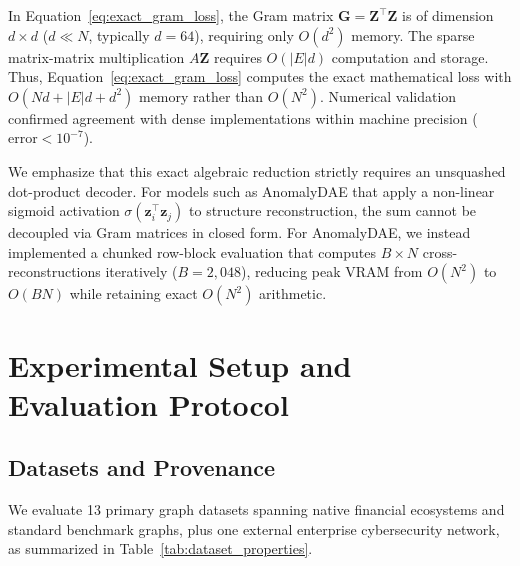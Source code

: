 \documentclass[11pt,a4paper]{article}
\begin{document}
In Equation~\eqref{eq:exact_gram_loss}, the Gram matrix $\mathbf{G} = \mathbf{Z}^\top \mathbf{Z}$ is of dimension $d \times d$ ($d \ll N$, typically $d=64$), requiring only $O(d^2)$ memory. The sparse matrix-matrix multiplication $A \mathbf{Z}$ requires $O(|E|d)$ computation and storage. Thus, Equation~\eqref{eq:exact_gram_loss} computes the exact mathematical loss with $O(N d + |E| d + d^2)$ memory rather than $O(N^2)$. Numerical validation confirmed agreement with dense implementations within machine precision ($\text{error} < 10^{-7}$).

We emphasize that this exact algebraic reduction strictly requires an unsquashed dot-product decoder. For models such as AnomalyDAE that apply a non-linear sigmoid activation $\sigma(\mathbf{z}_i^\top \mathbf{z}_j)$ to structure reconstruction, the sum cannot be decoupled via Gram matrices in closed form. For AnomalyDAE, we instead implemented a chunked row-block evaluation that computes $B \times N$ cross-reconstructions iteratively ($B=2,048$), reducing peak VRAM from $O(N^2)$ to $O(B N)$ while retaining exact $O(N^2)$ arithmetic.

\section{Experimental Setup and Evaluation Protocol}
\label{sec:experimental_setup}

\subsection{Datasets and Provenance}
We evaluate 13 primary graph datasets spanning native financial ecosystems and standard benchmark graphs, plus one external enterprise cybersecurity network, as summarized in Table~\ref{tab:dataset_properties}.
\end{document}
